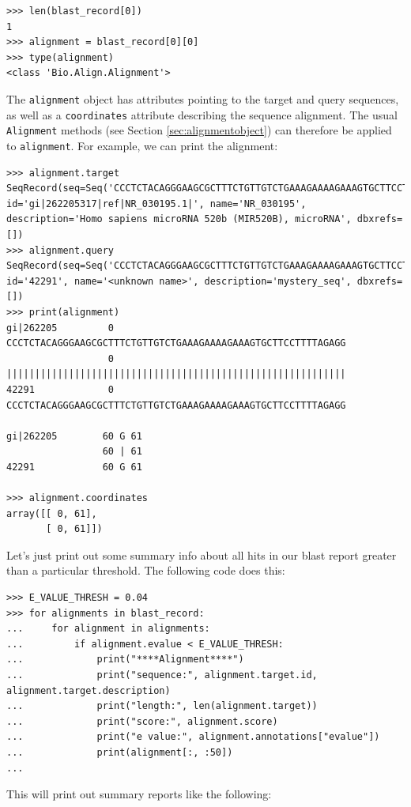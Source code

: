 \begin{verbatim}
>>> len(blast_record[0])
1
>>> alignment = blast_record[0][0]
>>> type(alignment)
<class 'Bio.Align.Alignment'>
\end{verbatim}
The \verb|alignment| object has attributes pointing to the target and query sequences, as well as a \verb|coordinates| attribute describing the sequence alignment. The usual \verb|Alignment| methods (see Section \ref{sec:alignmentobject}) can therefore be applied to \verb|alignment|. For example, we can print the alignment:
\begin{verbatim}
>>> alignment.target
SeqRecord(seq=Seq('CCCTCTACAGGGAAGCGCTTTCTGTTGTCTGAAAGAAAAGAAAGTGCTTCCTTT...GGG'), id='gi|262205317|ref|NR_030195.1|', name='NR_030195', description='Homo sapiens microRNA 520b (MIR520B), microRNA', dbxrefs=[])
>>> alignment.query
SeqRecord(seq=Seq('CCCTCTACAGGGAAGCGCTTTCTGTTGTCTGAAAGAAAAGAAAGTGCTTCCTTT...GGG'), id='42291', name='<unknown name>', description='mystery_seq', dbxrefs=[])
>>> print(alignment)
gi|262205         0 CCCTCTACAGGGAAGCGCTTTCTGTTGTCTGAAAGAAAAGAAAGTGCTTCCTTTTAGAGG
                  0 ||||||||||||||||||||||||||||||||||||||||||||||||||||||||||||
42291             0 CCCTCTACAGGGAAGCGCTTTCTGTTGTCTGAAAGAAAAGAAAGTGCTTCCTTTTAGAGG

gi|262205        60 G 61
                 60 | 61
42291            60 G 61

>>> alignment.coordinates
array([[ 0, 61],
       [ 0, 61]])
\end{verbatim}

Let's just print out some summary info about all hits in our blast report
greater than a particular threshold. The following code does this:

\begin{verbatim}
>>> E_VALUE_THRESH = 0.04
>>> for alignments in blast_record:
...     for alignment in alignments:
...         if alignment.evalue < E_VALUE_THRESH:
...             print("****Alignment****")
...             print("sequence:", alignment.target.id, alignment.target.description)
...             print("length:", len(alignment.target))
...             print("score:", alignment.score)
...             print("e value:", alignment.annotations["evalue"])
...             print(alignment[:, :50])
...
\end{verbatim}

This will print out summary reports like the following:

